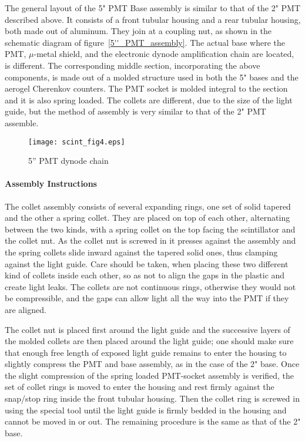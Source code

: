 \documentclass[12pt]{article}
\begin{document}
   The general layout of the 5" PMT Base assembly is similar to that of the 2" PMT
described above. It consists of a front tubular housing and a rear tubular
housing, both made out of aluminum. They join at a coupling nut, as shown in
the schematic diagram of figure~\ref{5''_PMT_assembly}. The actual base where the PMT, $\mu$-metal
shield, and the electronic dynode amplification chain are located, is
different. The corresponding middle section, incorporating the above
components, is made out of a molded structure used in both the 5" bases and
the aerogel Cherenkov counters. The PMT socket is molded integral to the
section and it is also spring loaded. The collets are different, due to the
size of the light guide, but the method of assembly is very similar to that of
the 2" PMT assemble. 

\begin{figure}
\begin{center}
\texttt{[image: scint\_fig4.eps]}
{\linespread{1.}
\caption[The 5" PMT base used in S3  trigger scintillators]{5'' PMT dynode chain}
\label{S3_PMT_dynode_chain}}
\end{center}
\end{figure}

\paragraph{Assembly Instructions}

   The collet assembly consists of several expanding rings, one set of solid
tapered and the other a spring collet. They are placed on top of each other,
alternating between the two kinds, with a spring collet on the top facing the
scintillator and the collet nut. As the collet nut is screwed in it presses
against the assembly and the spring collets slide inward against the tapered
solid ones, thus clamping against the light guide. Care should be taken, when
placing these two different kind of collets inside each other, so as not to
align the gaps in the plastic and create light leaks. The collets are not
continuous rings, otherwise they would not be compressible, and the gaps can
allow light all the way into the PMT if they are aligned. 

The collet nut is placed first around the light guide and the successive layers 
of the molded collets are then placed around the light guide; one should make 
sure that enough free length of exposed light guide remains to enter the 
housing to slightly compress the PMT and base assembly, as in the case of the 
2" base. Once the slight compression of the spring loaded PMT-socket assembly 
is verified, the set of collet rings is moved to enter the housing and rest 
firmly against the snap/stop ring inside the front tubular housing. Then the 
collet ring is screwed in using the special tool until the light guide is 
firmly bedded in the housing and cannot be moved in or out. The remaining 
procedure is the same as that of the 2" base.
\end{document}
